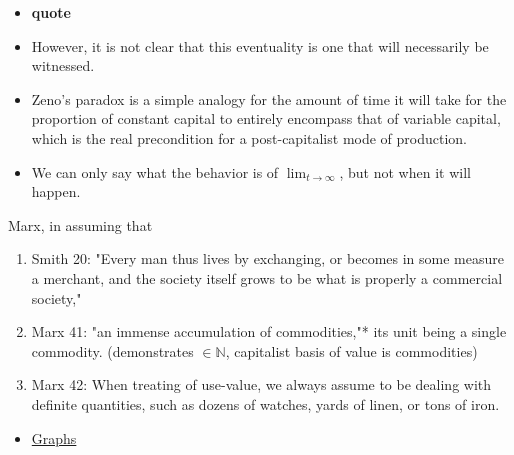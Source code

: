 \documentclass[12pt]{article}
\begin{document}
\begin{itemize}
    \item  \textbf{quote}
    \item However, it is not clear that this eventuality is one that will necessarily be witnessed.
    \item Zeno's paradox is a simple analogy for the amount of time it will take for the proportion of constant capital to entirely encompass that of variable capital, which is the real precondition for a post-capitalist mode of production.
    \item We can only say what the behavior is of $\lim_{t \to \infty}$, but not when it will happen.

    
\end{itemize}

Marx, in assuming that 








\begin{enumerate}
    \item Smith 20: "Every man thus lives by exchanging, or becomes in some measure a merchant, and the society itself grows to be what is properly a commercial society,"
    \item Marx 41: "an immense accumulation of commodities,"* its unit being a single commodity. (demonstrates $\in \mathbb{N}$, capitalist basis of value is commodities)
    \item Marx 42: When treating of use-value, we always assume to be dealing with definite quantities, such as dozens of watches, yards of linen, or tons of iron.
\end{enumerate}


\begin{itemize}
    \item \href{https://en.wikipedia.org/wiki/Graph_(abstract_data_type)}{Graphs}

\end{itemize}


\end{document}

